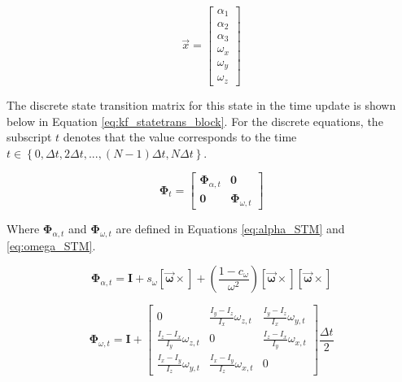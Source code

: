 \begin{equation} \label{eq:kf_state_def}
    \vec{x} = \begin{bmatrix}
        \alpha_1 \\ \alpha_2 \\ \alpha_3 \\ \omega_x \\ \omega_y \\ \omega_z
    \end{bmatrix}
\end{equation}

The discrete state transition matrix for this state in the time update is shown below in Equation \ref{eq:kf_statetrans_block}. For the discrete equations, the subscript $t$ denotes that the value corresponds to the time $t \in \left\{ 0, \Delta t, 2 \Delta t, ..., (N-1) \Delta t, N \Delta t \right\}$.

\begin{equation} \label{eq:kf_statetrans_block}
    \boldsymbol{\Phi}_t = \begin{bmatrix}
        \boldsymbol{\Phi}_{\alpha,t} & \boldsymbol{0} \\
        \boldsymbol{0} & \boldsymbol{\Phi}_{\omega,t}
    \end{bmatrix}
\end{equation}

Where $\boldsymbol{\Phi}_{\alpha,t}$ and $\boldsymbol{\Phi}_{\omega,t}$ are defined in Equations \ref{eq:alpha_STM} and \ref{eq:omega_STM}.

\begin{equation} \label{eq:alpha_STM}
    \boldsymbol{\Phi}_{\alpha,t} = \boldsymbol{I} + s_{\omega} \boldsymbol{\left[ \vec{\omega} \times \right]} + \left( \frac{1 - c_{\omega}}{\omega ^2} \right) \boldsymbol{\left[ \vec{\omega} \times \right]} \boldsymbol{\left[ \vec{\omega} \times \right]}
\end{equation}

\begin{equation} \label{eq:omega_STM}
    \boldsymbol{\Phi}_{\omega,t} = \boldsymbol{I} + \begin{bmatrix}
        0 & \frac{I_y - I_z}{I_x} \omega_{z,t} & \frac{I_y - I_z}{I_x} \omega_{y,t} \\
        \frac{I_z - I_x}{I_y} \omega_{z,t} & 0 & \frac{I_z - I_x}{I_y} \omega_{x,t} \\
        \frac{I_x - I_y}{I_z} \omega_{y,t} & \frac{I_x - I_y}{I_z} \omega_{x,t} & 0
    \end{bmatrix} \frac{\Delta t}{2}
\end{equation}


